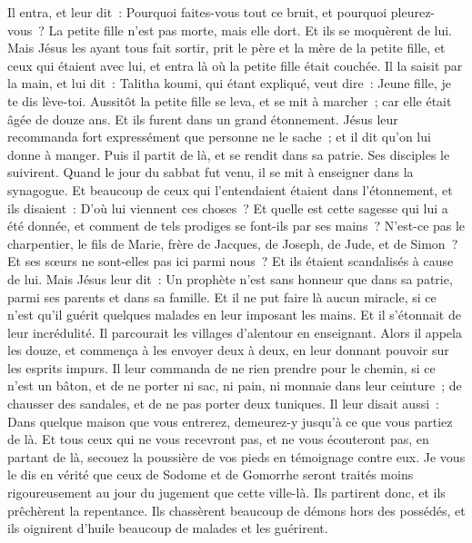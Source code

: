 \begin{multicols}{2}
Il entra, et leur dit~: Pourquoi faites-vous tout ce bruit, et pourquoi pleurez-vous~? La petite fille n'est pas morte, mais elle dort.
Et ils se moquèrent de lui. Mais Jésus les ayant tous fait sortir, prit le père et la mère de la petite fille, et ceux qui étaient avec lui, et entra là où la petite fille était couchée.
Il la saisit par la main, et lui dit~: Talitha koumi, qui étant expliqué, veut dire~: Jeune fille, je te dis lève-toi.
Aussitôt la petite fille se leva, et se mit à marcher~; car elle était âgée de douze ans. Et ils furent dans un grand étonnement.
Jésus leur recommanda fort expressément que personne ne le sache~; et il dit qu'on lui donne à manger.
\VerseOne{}Puis il partit de là, et se rendit dans sa patrie. Ses disciples le suivirent.
Quand le jour du sabbat fut venu, il se mit à enseigner dans la synagogue. Et beaucoup de ceux qui l'entendaient étaient dans l'étonnement, et ils disaient~: D'où lui viennent ces choses~? Et quelle est cette sagesse qui lui a été donnée, et comment de tels prodiges se font-ils par ses mains~?
N'est-ce pas le charpentier, le fils de Marie, frère de Jacques, de Joseph, de Jude, et de Simon~? Et ses sœurs ne sont-elles pas ici parmi nous~? Et ils étaient scandalisés à cause de lui.
Mais Jésus leur dit~: Un prophète n'est sans honneur que dans sa patrie, parmi ses parents et dans sa famille.
Et il ne put faire là aucun miracle, si ce n'est qu'il guérit quelques malades en leur imposant les mains.
Et il s'étonnait de leur incrédulité. Il parcourait les villages d'alentour en enseignant.
Alors il appela les douze, et commença à les envoyer deux à deux, en leur donnant pouvoir sur les esprits impurs.
Il leur commanda de ne rien prendre pour le chemin, si ce n'est un bâton, et de ne porter ni sac, ni pain, ni monnaie dans leur ceinture~;
de chausser des sandales, et de ne pas porter deux tuniques.
Il leur disait aussi~: Dans quelque maison que vous entrerez, demeurez-y jusqu'à ce que vous partiez de là.
Et tous ceux qui ne vous recevront pas, et ne vous écouteront pas, en partant de là, secouez la poussière de vos pieds en témoignage contre eux. Je vous le dis en vérité que ceux de Sodome et de Gomorrhe seront traités moins rigoureusement au jour du jugement que cette ville-là.
Ils partirent donc, et ils prêchèrent la repentance.
Ils chassèrent beaucoup de démons hors des possédés, et ils oignirent d'huile beaucoup de malades et les guérirent.

\end{multicols}
